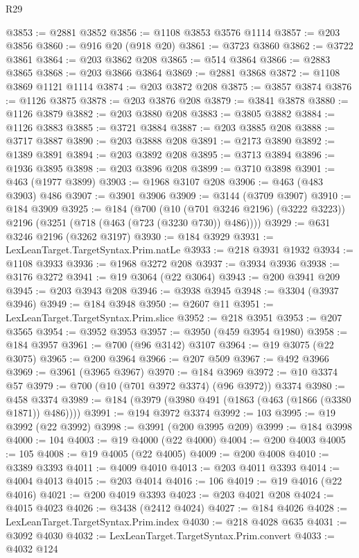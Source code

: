 \begin{lexlean}{R29}
\begin{coremodule}
@3853 := @2881 @3852
@3856 := @1108 @3853 @3576 @1114
@3857 := @203 @3856
@3860 := @916 @20 (@918 @20)
@3861 := @3723 @3860
@3862 := @3722 @3861
@3864 := @203 @3862 @208
@3865 := @514 @3864
@3866 := @2883 @3865
@3868 := @203 @3866 @3864
@3869 := @2881 @3868
@3872 := @1108 @3869 @1121 @1114
@3874 := @203 @3872 @208
@3875 := @3857 @3874
@3876 := @1126 @3875
@3878 := @203 @3876 @208
@3879 := @3841 @3878
@3880 := @1126 @3879
@3882 := @203 @3880 @208
@3883 := @3805 @3882
@3884 := @1126 @3883
@3885 := @3721 @3884
@3887 := @203 @3885 @208
@3888 := @3717 @3887
@3890 := @203 @3888 @208
@3891 := @2173 @3890
@3892 := @1389 @3891
@3894 := @203 @3892 @208
@3895 := @3713 @3894
@3896 := @1936 @3895
@3898 := @203 @3896 @208
@3899 := @3710 @3898
@3901 := @463 (@1977 @3899)
@3903 := @1968 @3107 @208
@3906 := @463 (@483 @3903) @486
@3907 := @3901 @3906
@3909 := @3144 (@3709 @3907)
@3910 := @184 @3909
@3925 := @184
    (@700
      (@10 (@701 @3246 @2196) (@3222 @3223))
      @2196
      (@3251 (@718 (@463 (@723 (@3230 @730)) @486))))
@3929 := @631 @3246 @2196 (@3262 @3197)
@3930 := @184 @3929
@3931 := LexLeanTarget.TargetSyntax.Prim.natLe
@3933 := @218 @3931 @1932
@3934 := @1108 @3933
@3936 := @1968 @3272 @208
@3937 := @3934 @3936
@3938 := @3176 @3272
@3941 := @19 @3064 (@22 @3064)
@3943 := @200 @3941 @209
@3945 := @203 @3943 @208
@3946 := @3938 @3945
@3948 := @3304 (@3937 @3946)
@3949 := @184 @3948
@3950 := @2607 @11
@3951 := LexLeanTarget.TargetSyntax.Prim.slice
@3952 := @218 @3951
@3953 := @207 @3565
@3954 := @3952 @3953
@3957 := @3950 (@459 @3954 @1980)
@3958 := @184 @3957
@3961 := @700 (@96 @3142) @3107
@3964 := @19 @3075 (@22 @3075)
@3965 := @200 @3964
@3966 := @207 @509
@3967 := @492 @3966
@3969 := @3961 (@3965 @3967)
@3970 := @184 @3969
@3972 := @10 @3374 @57
@3979 := @700 (@10 (@701 @3972 @3374) (@96 @3972)) @3374
@3980 := @458 @3374
@3989 := @184 (@3979 (@3980 @491 (@1863 (@463 (@1866 (@3380 @1871)) @486))))
@3991 := @194 @3972 @3374
@3992 := 103
@3995 := @19 @3992 (@22 @3992)
@3998 := @3991 (@200 @3995 @209)
@3999 := @184 @3998
@4000 := 104
@4003 := @19 @4000 (@22 @4000)
@4004 := @200 @4003
@4005 := 105
@4008 := @19 @4005 (@22 @4005)
@4009 := @200 @4008
@4010 := @3389 @3393
@4011 := @4009 @4010
@4013 := @203 @4011 @3393
@4014 := @4004 @4013
@4015 := @203 @4014
@4016 := 106
@4019 := @19 @4016 (@22 @4016)
@4021 := @200 @4019 @3393
@4023 := @203 @4021 @208
@4024 := @4015 @4023
@4026 := @3438 (@2412 @4024)
@4027 := @184 @4026
@4028 := LexLeanTarget.TargetSyntax.Prim.index
@4030 := @218 @4028 @635
@4031 := @3092 @4030
@4032 := LexLeanTarget.TargetSyntax.Prim.convert
@4033 := @4032 @124

\end{coremodule}
\end{lexlean}
